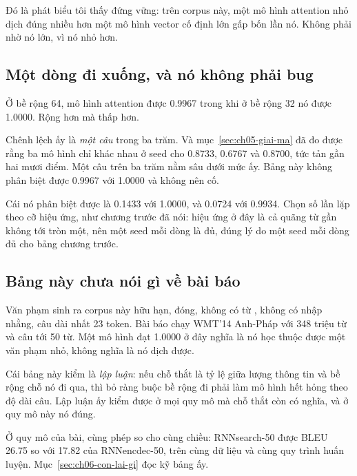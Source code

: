 Đó là phát biểu tôi thấy đứng vững: trên corpus này, một mô hình attention nhỏ
dịch đúng nhiều hơn một mô hình vector cố định lớn gấp bốn lần nó. Không phải
nhờ nó lớn, vì nó nhỏ hơn.

\subsection*{Một dòng đi xuống, và nó không phải bug}

%
Ở bề rộng 64, mô hình attention được 0.9967 trong khi ở bề rộng 32 nó được
1.0000. Rộng hơn mà thấp hơn.

Chênh lệch ấy là \emph{một câu} trong ba trăm. Và mục~\ref{sec:ch05-giai-ma} đã
đo được rằng ba mô hình chỉ khác nhau ở seed cho 0.8733, 0.6767 và 0.8700, tức
tản gần hai mươi điểm. Một câu trên ba trăm nằm sâu dưới mức ấy. Bảng này không
phân biệt được 0.9967 với 1.0000 và không nên cố.

Cái nó phân biệt được là 0.1433 với 1.0000, và 0.0724 với 0.9934. Chọn số lần
lặp theo cỡ hiệu ứng, như chương trước đã nói: hiệu ứng ở đây là cả quãng từ
gần không tới tròn một, nên một seed mỗi dòng là đủ, đúng lý do một seed mỗi
dòng đủ cho bảng chương trước.

\subsection*{Bảng này chưa nói gì về bài báo}

%
Văn phạm sinh ra corpus này hữu hạn,  đóng, không có từ
, không có nhập nhằng, câu dài nhất 23
token. Bài báo chạy WMT'14 Anh-Pháp với 348 triệu từ và câu tới 50 từ. Một mô
hình đạt 1.0000 ở đây nghĩa là nó học thuộc được một văn phạm nhỏ, không nghĩa
là nó dịch được.

Cái bảng này kiểm là \emph{lập luận}: nếu chỗ thắt là tỷ lệ giữa lượng thông
tin và bề rộng chỗ nó đi qua, thì bỏ ràng buộc bề rộng đi phải làm mô hình hết
hỏng theo độ dài câu. Lập luận ấy kiểm được ở mọi quy mô mà chỗ thắt còn có
nghĩa, và ở quy mô này nó đúng.

Ở quy mô của bài, cùng phép so cho cùng chiều: RNNsearch-50 được BLEU 26.75 so
với 17.82 của RNNencdec-50, trên cùng dữ liệu và cùng quy trình huấn luyện.
Mục~\ref{sec:ch06-con-lai-gi} đọc kỹ bảng ấy.
